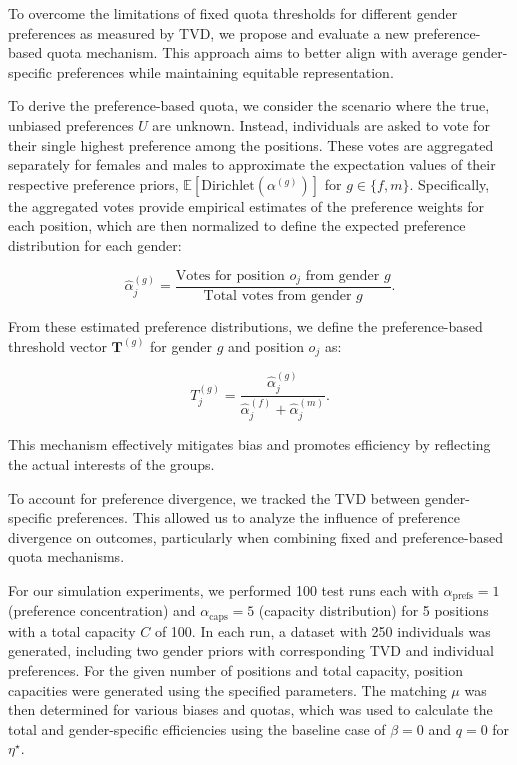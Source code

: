 \documentclass[letterpaper]{article}
\begin{document}
To overcome the limitations of fixed quota thresholds for different gender preferences as measured by TVD, we propose and evaluate a new preference-based quota mechanism. This approach aims to better align with average gender-specific preferences while maintaining equitable representation.

To derive the preference-based quota, we consider the scenario where the true, unbiased preferences \( U \) are unknown. Instead, individuals are asked to vote for their single highest preference among the positions. These votes are aggregated separately for females and males to approximate the expectation values of their respective preference priors, \( \mathbb{E}[\textrm{Dirichlet}(\alpha^{(g)})] \) for \( g \in \{f, m\} \). Specifically, the aggregated votes provide empirical estimates of the preference weights for each position, which are then normalized to define the expected preference distribution for each gender:

\[
\hat{\alpha}^{(g)}_j = \frac{\text{Votes for position } o_j \text{ from gender } g}{\text{Total votes from gender } g}.
\]

From these estimated preference distributions, we define the preference-based threshold vector \( \mathbf{T}^{(g)} \) for gender \( g \) and position \( o_j \) as:

\[
T_j^{(g)} = \frac{\hat{\alpha}^{(g)}_j}{\hat{\alpha}^{(f)}_j + \hat{\alpha}^{(m)}_j}.
\]

This mechanism effectively mitigates bias and promotes efficiency by reflecting the actual interests of the groups.

To account for preference divergence, we tracked the TVD between gender-specific preferences. This allowed us to analyze the influence of preference divergence on outcomes, particularly when combining fixed and preference-based quota mechanisms.


For our simulation experiments, we performed 100 test runs each with \( \alpha_\text{prefs} = 1 \) (preference concentration) and \( \alpha_\text{caps} = 5 \) (capacity distribution) for 5 positions with a total capacity \( C \) of 100. In each run, a dataset with 250 individuals was generated, including two gender priors with corresponding TVD and individual preferences. For the given number of positions and total capacity, position capacities were generated using the specified parameters. The matching \( \mu \) was then determined for various biases and quotas, which was used to calculate the total and gender-specific efficiencies using the baseline case of \( \beta = 0 \) and \( q = 0 \) for \(\eta^{\star}\). 
\end{document}
